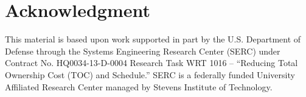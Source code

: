 \section*{Acknowledgment}
This material is based upon work supported in part by the U.S. Department of Defense through the Systems Engineering Research Center (SERC) under Contract No. HQ0034-13-D-0004 Research Task WRT 1016 -- ``Reducing Total Ownership Cost (TOC) and Schedule.'' SERC is a federally funded University Affiliated Research Center managed by Stevens Institute of Technology. 
